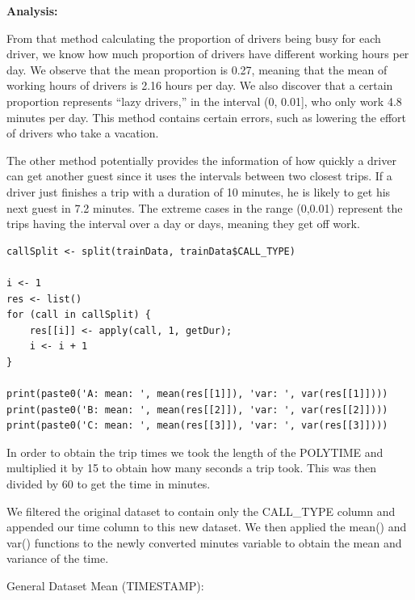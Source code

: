 \documentclass[11pt]{article}
\begin{document}
\noindent\textbf{Analysis:}\\
\par
From that method calculating the proportion of drivers being busy for each driver, we know how much proportion of drivers have different working
hours per day. We observe that the mean proportion is 0.27, meaning that the mean of working hours of drivers is 2.16 hours per day. We also discover
that a certain proportion represents “lazy drivers,” in the interval (0, 0.01], who only work 4.8 minutes per day. This method contains certain errors,
such as lowering the effort of drivers who take a vacation.
\par
	The other method potentially provides the information of how quickly a driver can get another guest since it uses the intervals between two closest
	trips. If a driver just finishes a trip with a duration of 10 minutes, he is likely to get his next guest in 7.2 minutes. The extreme cases in the
	range (0,0.01) represent the trips having the interval over a day or days, meaning they get off work.



\begin{lstlisting}
callSplit <- split(trainData, trainData$CALL_TYPE)

i <- 1
res <- list()
for (call in callSplit) {
	res[[i]] <- apply(call, 1, getDur);
	i <- i + 1
}
  
print(paste0('A: mean: ', mean(res[[1]]), 'var: ', var(res[[1]])))
print(paste0('B: mean: ', mean(res[[2]]), 'var: ', var(res[[2]])))
print(paste0('C: mean: ', mean(res[[3]]), 'var: ', var(res[[3]])))
\end{lstlisting}

\flushleft\par
In order to obtain the trip times we took the length of the POLYTIME and multiplied it by 15 to obtain how many seconds a trip took. This was then divided by 60 to get the time in minutes.

\par
We filtered the original dataset to contain only the CALL\_TYPE column and appended our time column to this new dataset. We then applied the mean() and var() functions to the newly converted minutes variable to obtain the mean and variance of the time.

\par
General Dataset Mean (TIMESTAMP):
\end{document}
